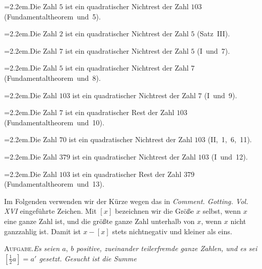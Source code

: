 %
{\raggedright\hangindent=2.2em.\quad Die Zahl $5$ ist ein quadratischer Nichtrest der Zahl $103$ \mbox{(Fundamentaltheorem und 5)}.\par}

{\raggedright\hangindent=2.2em.\quad Die Zahl $2$ ist ein quadratischer Nichtrest der Zahl $5$ \mbox{(Satz III)}.\par}

{\raggedright\hangindent=2.2em.\quad Die Zahl $7$ ist ein quadratischer Nichtrest der Zahl $5$ \mbox{(I und 7)}.\par}

{\raggedright\hangindent=2.2em.\quad Die Zahl $5$ ist ein quadratischer Nichtrest der Zahl $7$ \mbox{(Fundamentaltheorem und 8)}.\par}

{\raggedright\hangindent=2.2em.\quad Die Zahl $103$ ist ein quadratischer Nichtrest der Zahl $7$ \mbox{(I und 9)}.\par}

{\raggedright\hangindent=2.2em.\quad Die Zahl $7$ ist ein quadratischer Rest der Zahl $103$ \mbox{(Fundamentaltheorem und 10)}.\par}

{\raggedright\hangindent=2.2em.\quad Die Zahl $70$ ist ein quadratischer Nichtrest der Zahl $103$ \mbox{(II, 1, 6, 11)}.\par}

{\raggedright\hangindent=2.2em.\quad Die Zahl $379$ ist ein quadratischer Nichtrest der Zahl $103$ \mbox{(I und 12)}.\par}

{\raggedright\hangindent=2.2em.\quad Die Zahl $103$ ist ein quadratischer Rest der Zahl $379$ \mbox{(Fundamentaltheorem und 13)}.\par}

Im Folgenden verwenden wir der Kürze wegen das in \textit{Comment. Gotting. Vol. XVI} eingeführte Zeichen. Mit $[x]$ bezeichnen wir die Größe $x$ selbst, wenn $x$ eine ganze Zahl ist, und die größte ganze Zahl unterhalb von $x$, wenn $x$ nicht ganzzahlig ist. Damit ist $x-[x]$ stets nichtnegativ und kleiner als eins.


\textsc{Aufgabe.}\quad \textit{Es seien $a,\ b$ positive, zueinander teilerfremde ganze Zahlen, und es sei $[\frac12a]=a'$ gesetzt. Gesucht ist die Summe}

